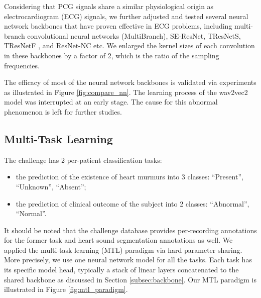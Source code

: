 


Considering that PCG signals share a similar physiological origin as electrocardiogram (ECG) signals, we further adjusted and tested several neural network backbones that have proven effective in ECG problems, including multi-branch convolutional neural networks (MultiBranch), SE-ResNet, TResNetS, TResNetF \cite{Kang_2022_cinc2021_iop}, and ResNet-NC \cite{ribeiro2020automatic} etc. We enlarged the kernel sizes of each convolution in these backbones by a factor of 2, which is the ratio of the sampling frequencies.

The efficacy of most of the neural network backbones is validated via experiments as illustrated in Figure \ref{fig:compare_nn}. The learning process of the wav2vec2 model was interrupted at an early stage. The cause for this abnormal phenomenon is left for further studies.



\subsection{Multi-Task Learning}
\label{subsec:mtl}

The challenge \cite{cinc2022} has 2 per-patient classification tasks:
\begin{itemize}
    \item the prediction of the existence of heart murmurs into 3 classes: ``Present'', ``Unknown'', ``Absent'';
    \item the prediction of clinical outcome of the subject into 2 classes: ``Abnormal'', ``Normal''.
\end{itemize}

It should be noted that the challenge database \cite{Oliveira_2021_CirCor} provides per-recording annotations for the former task and heart sound segmentation annotations as well. We applied the multi-task learning (MTL) paradigm \cite{Caruana_1997_mtl} via hard parameter sharing. More precisely, we use one neural network model for all the tasks. Each task has its specific model head, typically a stack of linear layers concatenated to the shared backbone as discussed in Section \ref{subsec:backbone}. Our MTL paradigm is illustrated in Figure \ref{fig:mtl_paradigm}.

